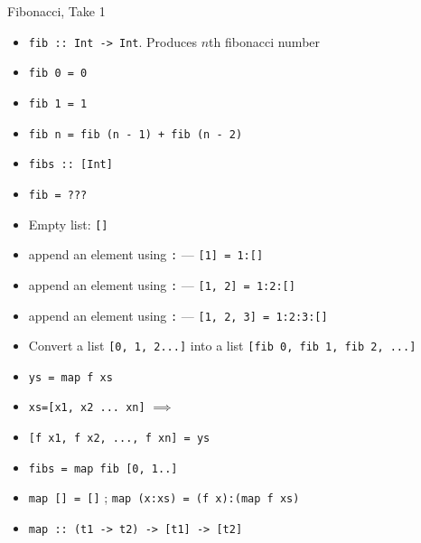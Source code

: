 \documentclass[8pt]{beamer}
\newcommand{\hs}[1]{\texttt{#1}}
\begin{document}
\begin{frame}[fragile]{Fibonacci, Take 1}
\begin{itemize}
    \item \hs{fib :: Int -> Int}. Produces $n$th fibonacci number
    \item \hs{fib 0 = 0}\pause
    \item \hs{fib 1 = 1}\pause
    \item \hs{fib n = fib (n - 1) + fib (n - 2)}\pause
    \item \hs{fibs :: [Int]} \pause
    \item \hs{fib = ???}\pause
    \item Empty list: \hs{[]} \pause
    \item append an element using \hs{:} --- \hs{[1] = 1:[]}\pause
    \item append an element using \hs{:} --- \hs{[1, 2] = 1:2:[]}\pause
    \item append an element using \hs{:} --- \hs{[1, 2, 3] = 1:2:3:[]}\pause
    \item Convert a list \hs{[0, 1, 2...]} into a list \hs{[fib 0, fib 1, fib 2, ...]}
\end{itemize}

\pause

\begin{itemize}
    \item \hs{ys = map f xs}
    \item \hs{xs=[x1, x2 ... xn]} $\implies$
    \item \hs{[f x1, f x2, ..., f xn] = ys}
    \item \hs{fibs = map fib [0, 1..]} \pause
    \item \hs{map [] = []} \pause; \hs{map (x:xs) = (f x):(map f xs)}\pause
    \item \hs{map :: (t1 -> t2) -> [t1] -> [t2]}
\end{itemize}
\pause
\end{frame}
\end{document}
